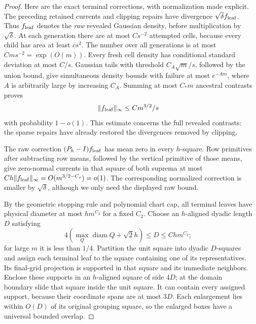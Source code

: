 \documentclass[11pt]{article}
\numberwithin{equation}{section}
\begin{document}
\begin{proof}
Here are the exact terminal corrections, with normalization made
explicit. The preceding retained currents and clipping repairs have
divergence $\sqrt\delta f_{\rm leaf}$. Thus $f_{\rm leaf}$ denotes
the \emph{raw} revealed Gaussian density, before multiplication by
$\sqrt\delta$. At each generation there are at most $Cs^{-2}$
attempted cells, because every child has area at least $cs^2$.
The number over all generations is at most $Cm s^{-2}=\exp(O(m))$.
Every fresh cell density has conditional standard deviation at
most $C/s$. Gaussian tails with threshold $C_A\sqrt m/s$, followed
by the union bound, give simultaneous density bounds with failure
at most $e^{-Am}$, where $A$ is arbitrarily large by increasing
$C_A$. Summing at most $C_*m$ ancestral contrasts proves
\[
 \|f_{\rm leaf}\|_\infty\le Cm^{3/2}/s
\]
with probability $1-o(1)$. This estimate concerns the full revealed
contrasts: the sparse repairs have already restored the divergences
removed by clipping.

The raw correction $(P_h-I)f_{\rm leaf}$ has mean zero in every
$h$-square. Row primitives after subtracting row means, followed
by the vertical primitive of those means, give zero-normal
currents in that square of both suprema at most
$Ch\|f_{\rm leaf}\|_\infty=O(m^{3/2-C_s})=o(1)$.
The corresponding normalized correction is smaller by
$\sqrt\delta$, although we only need the displayed raw bound.

By the geometric stopping rule and polynomial chart cap, all
terminal leaves have physical diameter at most $h m^{C_2}$ for
a fixed $C_2$. Choose an $h$-aligned dyadic length $D$ satisfying
\[
 4(\max_Q\operatorname{diam}Q+\sqrt2h)\le D
 \le C h m^{C_2};
\]
for large $m$ it is less than $1/4$. Partition the unit square
into dyadic $D$-squares and assign each terminal leaf to the
square containing one of its representatives. Its final-grid
projection is supported in that square and its immediate
neighbors. Enclose these supports in an $h$-aligned square of
side $4D$; at the domain boundary slide that square inside the
unit square. It can contain every assigned support, because their
coordinate spans are at most $3D$. Each enlargement lies within
$O(D)$ of its original grouping square, so the enlarged boxes
have a universal bounded overlap.


\end{proof}
\end{document}

